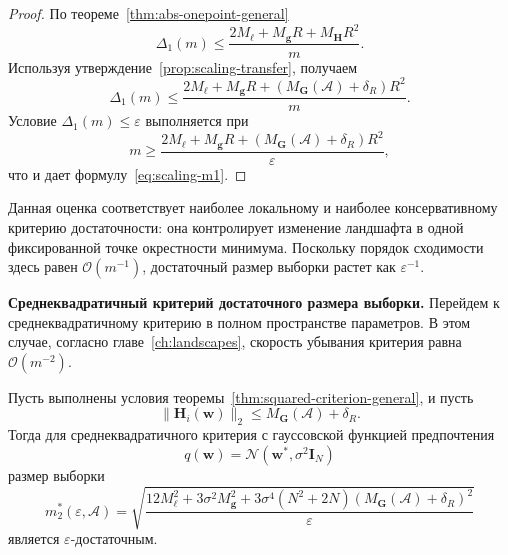 \begin{proof}
    По теореме~\ref{thm:abs-onepoint-general}
    \begin{equation}
        \Delta_1(m)
        \le
        \frac{
            2M_{\ell}
            +
            M_{\mathbf g}R
            +
            M_{\mathbf H}R^2
        }{m}.
    \end{equation}
    Используя утверждение~\ref{prop:scaling-transfer}, получаем
    \begin{equation}
        \Delta_1(m)
        \le
        \frac{
            2M_{\ell}
            +
            M_{\mathbf g}R
            +
            \left(M_{\mathbf G}(\mathcal A)+\delta_R\right)R^2
        }{m}.
    \end{equation}
    Условие $\Delta_1(m)\le\varepsilon$ выполняется при
    \begin{equation}
        m
        \ge
        \frac{
            2M_{\ell}
            +
            M_{\mathbf g}R
            +
            \left(M_{\mathbf G}(\mathcal A)+\delta_R\right)R^2
        }{\varepsilon},
    \end{equation}
    что и дает формулу~\eqref{eq:scaling-m1}.
\end{proof}

Данная оценка соответствует наиболее локальному и наиболее консервативному критерию достаточности: она контролирует изменение ландшафта в одной фиксированной точке окрестности минимума. Поскольку порядок сходимости здесь равен $\mathcal O(m^{-1})$, достаточный размер выборки растет как $\varepsilon^{-1}$.

\textbf{Среднеквадратичный критерий достаточного размера выборки.} Перейдем к среднеквадратичному критерию в полном пространстве параметров. В этом случае, согласно главе~\ref{ch:landscapes}, скорость убывания критерия равна $\mathcal O(m^{-2})$.

\begin{theorem}
    \label{thm:scaling-sufficient-squared}
    Пусть выполнены условия теоремы~\ref{thm:squared-criterion-general}, и пусть
    \begin{equation}
        \|\mathbf H_i(\mathbf w)\|_2
        \le
        M_{\mathbf G}(\mathcal A)+\delta_R.
    \end{equation}
    Тогда для среднеквадратичного критерия с гауссовской функцией предпочтения
    \begin{equation}
        q(\mathbf w)=\mathcal N(\mathbf w^*,\sigma^2\mathbf I_N)
    \end{equation}
    размер выборки
    \begin{equation}
        \label{eq:scaling-m2}
        m_2^*(\varepsilon,\mathcal A)
        =
        \sqrt{
            \frac{
                12M_{\ell}^2
                +
                3\sigma^2 M_{\mathbf g}^2
                +
                3\sigma^4(N^2+2N)\left(M_{\mathbf G}(\mathcal A)+\delta_R\right)^2
            }{\varepsilon}
        }
    \end{equation}
    является $\varepsilon$-достаточным.
\end{theorem}

